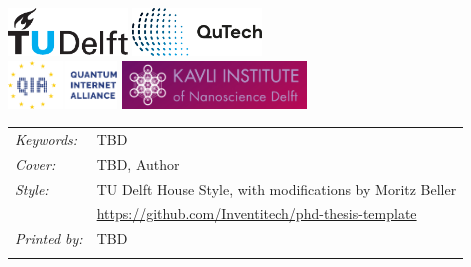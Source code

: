\begin{titlepage}

\vfill

\begin{center}
\noindent
\includegraphics[height=0.5in]{figures/logos/tudelft.pdf}
\hfill
\includegraphics[height=0.5in]{figures/logos/qutech.pdf}
\hfill
\\ \vspace{2\baselineskip}
\includegraphics[height=0.5in]{figures/logos/qia.pdf}
\hfill
\includegraphics[height=0.5in]{figures/logos/kavli.pdf}
\hfill
\end{center}

\vfill

\noindent
\begin{tabular}{@{}p{}@{}p{}}
    \textit{Keywords:} & TBD \\[\medskipamount]
    \textit{Cover:} & TBD, Author \\[\medskipamount]
    \textit{Style:} & TU Delft House Style, with modifications by Moritz Beller \\
    & \url{https://github.com/Inventitech/phd-thesis-template} \\[\medskipamount]
    \textit{Printed by:} & TBD \\
    & \\[\medskipamount]
\end{tabular}


\end{titlepage}
